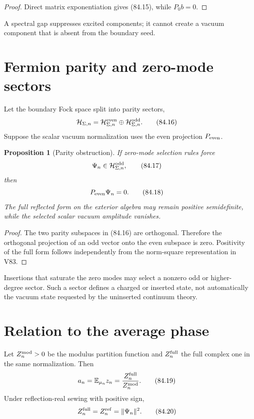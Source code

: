 \documentclass[11pt]{article}
\newtheorem{proposition}[theorem]{Proposition}
\theoremstyle{remark}
\begin{document}
\begin{proof}
Direct matrix exponentiation gives (84.15), while \(P_0b=0\).
\end{proof}

A spectral gap suppresses excited components; it cannot create a
vacuum component that is absent from the boundary seed.

\section{Fermion parity and zero-mode sectors}

Let the boundary Fock space split into parity sectors,
\[
 {\cal H}_{\Sigma,n}
 =
 {\cal H}^{\rm even}_{\Sigma,n}
 \oplus{\cal H}^{\rm odd}_{\Sigma,n}.                 \tag{84.16}
\]
Suppose the scalar vacuum normalization uses the even projection
\(P_{\rm even}\).

\begin{proposition}[Parity obstruction]
\label{prop:v15v84-parity}
If zero-mode selection rules force
\[
 \Psi_n\in{\cal H}^{\rm odd}_{\Sigma,n},               \tag{84.17}
\]
then
\[
 P_{\rm even}\Psi_n=0.                                \tag{84.18}
\]
The full reflected form on the exterior algebra may remain positive
semidefinite, while the selected scalar vacuum amplitude vanishes.
\end{proposition}

\begin{proof}
The two parity subspaces in (84.16) are orthogonal.  Therefore the
orthogonal projection of an odd vector onto the even subspace is
zero.  Positivity of the full form follows independently from the
norm-square representation in V83.
\end{proof}

Insertions that saturate the zero modes may select a nonzero odd or
higher-degree sector.  Such a sector defines a charged or inserted
state, not automatically the vacuum state requested by the
uninserted continuum theory.

\section{Relation to the average phase}

Let \(Z_n^{\rm mod}>0\) be the modulus partition function and
\(Z_n^{\rm full}\) the full complex one in the same normalization.
Then
\[
 a_n=\mathbb E_{\mu_n}z_n
 =
 \frac{Z_n^{\rm full}}{Z_n^{\rm mod}}.                \tag{84.19}
\]
Under reflection-real sewing with positive sign,
\[
 Z_n^{\rm full}=Z_n^{\rm ref}=\|\Psi_n\|^2.           \tag{84.20}
\]
\end{document}
